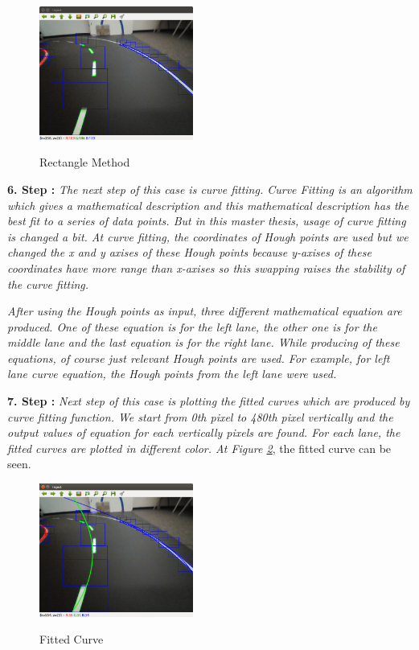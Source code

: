 \begin{figure}[H]
 \centering
  \includegraphics[width=0.45\textwidth]{./Bilder/Case1_Rectangles.png}\label{fig:Case1_Rectangles}
	\caption{Rectangle Method}
\end{figure}


\textbf{6. Step : }\emph{\color{blue}The next step of this case is curve fitting. Curve Fitting is an algorithm which gives a mathematical description and this mathematical description has the best fit to a series of data points. But in this master thesis, usage of curve fitting is changed a bit. At curve fitting, the coordinates of Hough points are used but we changed the x and y axises of these Hough points because y-axises of these coordinates have more range than x-axises so this swapping raises the stability of the curve fitting.}

\emph{\color{blue}After using the Hough points as input, three different mathematical equation are produced. One of these equation is for the left lane, the other one is for the middle lane and the last equation is for the right lane. While producing of these equations, of course just relevant Hough points are used. For example, for left lane curve equation, the Hough points from the left lane were used.}
 
\textbf{7. Step : }\emph{\color{blue}Next step of this case is plotting the fitted curves which are produced by curve fitting function. We start from 0th pixel to 480th pixel vertically and the output values of equation for each vertically pixels are found. For each lane, the fitted curves are plotted in different color. At Figure \ref{fig:Case1_CurveFittingwithoutIPM.png}}, the fitted curve can be seen.


\begin{figure}[H]
 \centering
  \includegraphics[width=0.45\textwidth]{./Bilder/Case1_CurveFittingwithoutIPM.png}\label{fig:Case1_CurveFittingwithoutIPM.png}
	\caption{Fitted Curve}
\end{figure}


